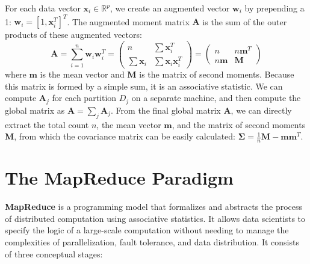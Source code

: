 For each data vector $\mathbf{x}_i \in \mathbb{R}^p$, we create an augmented vector $\mathbf{w}_i$ by prepending a 1: $\mathbf{w}_i = [1, \mathbf{x}_i^T]^T$. The augmented moment matrix $\mathbf{A}$ is the sum of the outer products of these augmented vectors:
$$ \mathbf{A} = \sum_{i=1}^{n} \mathbf{w}_i \mathbf{w}_i^T = 
\begin{pmatrix}
n & \sum \mathbf{x}_i^T \\
\sum \mathbf{x}_i & \sum \mathbf{x}_i \mathbf{x}_i^T
\end{pmatrix}
=
\begin{pmatrix}
n & n\mathbf{m}^T \\
n\mathbf{m} & \mathbf{M}
\end{pmatrix}
$$
where $\mathbf{m}$ is the mean vector and $\mathbf{M}$ is the matrix of second moments. Because this matrix is formed by a simple sum, it is an associative statistic. We can compute $\mathbf{A}_j$ for each partition $D_j$ on a separate machine, and then compute the global matrix as $\mathbf{A} = \sum_j \mathbf{A}_j$. From the final global matrix $\mathbf{A}$, we can directly extract the total count $n$, the mean vector $\mathbf{m}$, and the matrix of second moments $\mathbf{M}$, from which the covariance matrix can be easily calculated: $\mathbf{\Sigma} = \frac{1}{n}\mathbf{M} - \mathbf{m}\mathbf{m}^T$.

\section{The MapReduce Paradigm}
\label{sec:mapreduce}
\textbf{MapReduce} is a programming model that formalizes and abstracts the process of distributed computation using associative statistics. It allows data scientists to specify the logic of a large-scale computation without needing to manage the complexities of parallelization, fault tolerance, and data distribution. It consists of three conceptual stages:

